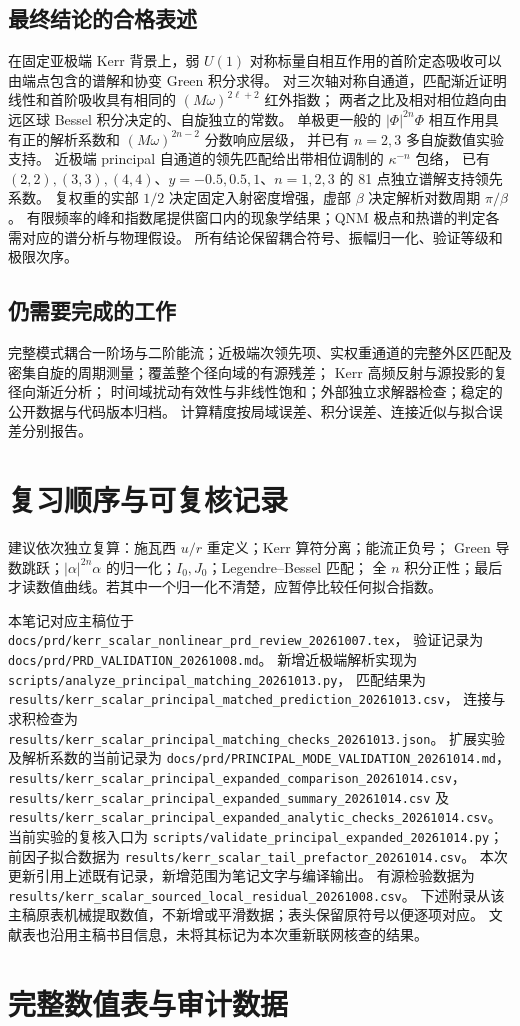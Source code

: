 \documentclass[UTF8,fontset=fandol,11pt,a4paper]{ctexart}
\numberwithin{equation}{section}
\begin{document}
\subsection{最终结论的合格表述}
在固定亚极端 Kerr 背景上，弱 $U(1)$ 对称标量自相互作用的首阶定态吸收可以由端点包含的谱解和协变 Green 积分求得。
对三次轴对称自通道，匹配渐近证明线性和首阶吸收具有相同的 $(M\omega)^{2\ell+2}$ 红外指数；
两者之比及相对相位趋向由远区球 Bessel 积分决定的、自旋独立的常数。
单极更一般的 $|\Phi|^{2n}\Phi$ 相互作用具有正的解析系数和 $(M\omega)^{2n-2}$ 分数响应层级，
并已有 $n=2,3$ 多自旋数值实验支持。
近极端 principal 自通道的领先匹配给出带相位调制的 $\kappa^{-n}$ 包络，
已有 $(2,2),(3,3),(4,4)$、$y=-0.5,0.5,1$、$n=1,2,3$ 的 81 点独立谱解支持领先系数。
复权重的实部 $1/2$ 决定固定入射密度增强，虚部 $\beta$ 决定解析对数周期 $\pi/\beta$。
有限频率的峰和指数尾提供窗口内的现象学结果；QNM 极点和热谱的判定各需对应的谱分析与物理假设。
所有结论保留耦合符号、振幅归一化、验证等级和极限次序。

\subsection{仍需要完成的工作}
完整模式耦合一阶场与二阶能流；近极端次领先项、实权重通道的完整外区匹配及密集自旋的周期测量；覆盖整个径向域的有源残差；
Kerr 高频反射与源投影的复径向渐近分析；
时间域扰动有效性与非线性饱和；外部独立求解器检查；稳定的公开数据与代码版本归档。
计算精度按局域误差、积分误差、连接近似与拟合误差分别报告。

\section{复习顺序与可复核记录}
建议依次独立复算：施瓦西 $u/r$ 重定义；Kerr 算符分离；能流正负号；
Green 导数跳跃；$|\alpha|^{2n}\alpha$ 的归一化；$I_0,J_0$；Legendre--Bessel 匹配；
全 $n$ 积分正性；最后才读数值曲线。若其中一个归一化不清楚，应暂停比较任何拟合指数。

本笔记对应主稿位于 \nolinkurl{docs/prd/kerr_scalar_nonlinear_prd_review_20261007.tex}，
验证记录为 \nolinkurl{docs/prd/PRD_VALIDATION_20261008.md}。
新增近极端解析实现为 \nolinkurl{scripts/analyze_principal_matching_20261013.py}，
匹配结果为 \nolinkurl{results/kerr_scalar_principal_matched_prediction_20261013.csv}，
连接与求积检查为 \nolinkurl{results/kerr_scalar_principal_matching_checks_20261013.json}。
扩展实验及解析系数的当前记录为
\nolinkurl{docs/prd/PRINCIPAL_MODE_VALIDATION_20261014.md}，
\nolinkurl{results/kerr_scalar_principal_expanded_comparison_20261014.csv}，
\nolinkurl{results/kerr_scalar_principal_expanded_summary_20261014.csv} 及
\nolinkurl{results/kerr_scalar_principal_expanded_analytic_checks_20261014.csv}。
当前实验的复核入口为 \nolinkurl{scripts/validate_principal_expanded_20261014.py}；
前因子拟合数据为 \nolinkurl{results/kerr_scalar_tail_prefactor_20261014.csv}。
本次更新引用上述既有记录，新增范围为笔记文字与编译输出。
有源检验数据为 \nolinkurl{results/kerr_scalar_sourced_local_residual_20261008.csv}。
下述附录从该主稿原表机械提取数值，不新增或平滑数据；表头保留原符号以便逐项对应。
文献表也沿用主稿书目信息，未将其标记为本次重新联网核查的结果。
\clearpage\appendix
\section{完整数值表与审计数据}

\clearpage

\end{document}
